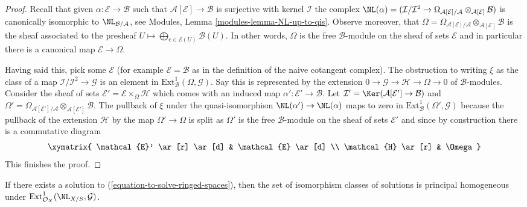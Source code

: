 \begin{proof}
Recall that given $\alpha : \mathcal{E} \to \mathcal{B}$
such that $\mathcal{A}[\mathcal{E}] \to \mathcal{B}$ is surjective
with kernel $\mathcal{I}$ the complex
$\NL(\alpha) = (\mathcal{I}/\mathcal{I}^2 \to 
\Omega_{\mathcal{A}[\mathcal{E}]/\mathcal{A}}
\otimes_{\mathcal{A}[\mathcal{E}]} \mathcal{B})$ is canonically
isomorphic to $\NL_{\mathcal{B}/\mathcal{A}}$, see
Modules, Lemma \ref{modules-lemma-NL-up-to-qis}.
Observe moreover, that
$\Omega = \Omega_{\mathcal{A}[\mathcal{E}]/\mathcal{A}}
\otimes_{\mathcal{A}[\mathcal{E}]} \mathcal{B}$ is the sheaf
associated to the presheaf
$U \mapsto \bigoplus_{e \in \mathcal{E}(U)} \mathcal{B}(U)$.
In other words, $\Omega$ is the free $\mathcal{B}$-module on the
sheaf of sets $\mathcal{E}$ and in particular there is a canonical
map $\mathcal{E} \to \Omega$.

\medskip\noindent
Having said this, pick some $\mathcal{E}$ (for example
$\mathcal{E} = \mathcal{B}$ as in the definition of the naive cotangent
complex). The obstruction to writing $\xi$ as the class of a map
$\mathcal{I}/\mathcal{I}^2 \to \mathcal{G}$ is an element in
$\text{Ext}^1_\mathcal{B}(\Omega, \mathcal{G})$. Say this is represented
by the extension $0 \to \mathcal{G} \to \mathcal{H} \to \Omega \to 0$
of $\mathcal{B}$-modules. Consider the sheaf of sets
$\mathcal{E}' = \mathcal{E} \times_\Omega \mathcal{H}$
which comes with an induced map $\alpha' : \mathcal{E}' \to \mathcal{B}$.
Let $\mathcal{I}' = \Ker(\mathcal{A}[\mathcal{E}'] \to \mathcal{B})$
and $\Omega' = \Omega_{\mathcal{A}[\mathcal{E}']/\mathcal{A}}
\otimes_{\mathcal{A}[\mathcal{E}']} \mathcal{B}$.
The pullback of $\xi$ under the quasi-isomorphism
$\NL(\alpha') \to \NL(\alpha)$ maps to zero in
$\text{Ext}^1_\mathcal{B}(\Omega', \mathcal{G})$
because the pullback of the extension $\mathcal{H}$
by the map $\Omega' \to \Omega$ is split as $\Omega'$ is the free
$\mathcal{B}$-module on the sheaf of sets $\mathcal{E}'$ and since
by construction there is a commutative diagram
$$
\xymatrix{
\mathcal{E}' \ar[r] \ar[d] & \mathcal{E} \ar[d] \\
\mathcal{H} \ar[r] & \Omega
}
$$
This finishes the proof.
\end{proof}

\begin{lemma}
\label{lemma-choices-ringed-spaces}
If there exists a solution to (\ref{equation-to-solve-ringed-spaces}),
then the set of isomorphism classes of solutions is principal homogeneous
under $\text{Ext}^1_{\mathcal{O}_X}(\NL_{X/S}, \mathcal{G})$.
\end{lemma}

